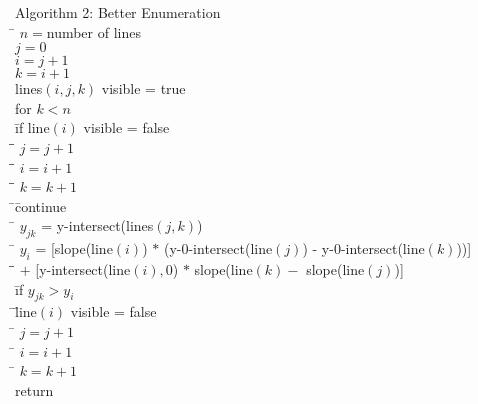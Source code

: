 \documentclass{article}
\begin{document}
\begin{tabbing}
  {\sc Algorithm 2: Better Enumeration}\\
  \qquad \= $n = $number of lines \\
  \> $j = 0$ \\
  \> $i = j+1$\\
  \> $k = i+1$\\
  \> lines$(i,j,k)$ visible = true\\
  \> for $k < n$\\
  \> \qquad \= if line$(i)$ visible = false\\
  \> \qquad \= \qquad \= $j = j+1$\\
  \> \qquad \= \qquad \= $i = i+1$\\
  \> \qquad \= \qquad \= $k = k+1$\\
  \> \qquad \= \qquad \= continue\\
  \> \qquad \= $y_{jk}$ = y-intersect(lines$(j,k)$)\\
  \> \qquad \= $y_{i}$ = [slope(line$(i)$) $*$ (y-0-intersect(line$(j)$) - y-0-intersect(line$(k)$))]\\
  \> \qquad \= \qquad \= $+$  [y-intersect(line$(i),0$) $*$ slope(line$(k) -$ slope(line$(j)$)]\\ 
  \> \qquad \= if $y_{jk} > y_{i}$\\
  \> \qquad \= \qquad \= line$(i)$ visible = false\\
  \> \qquad \= $j = j+1$\\
  \> \qquad \= $i = i+1$\\
  \> \qquad \= $k = k+1$\\
  \> return
\end{tabbing}
\end{document}
